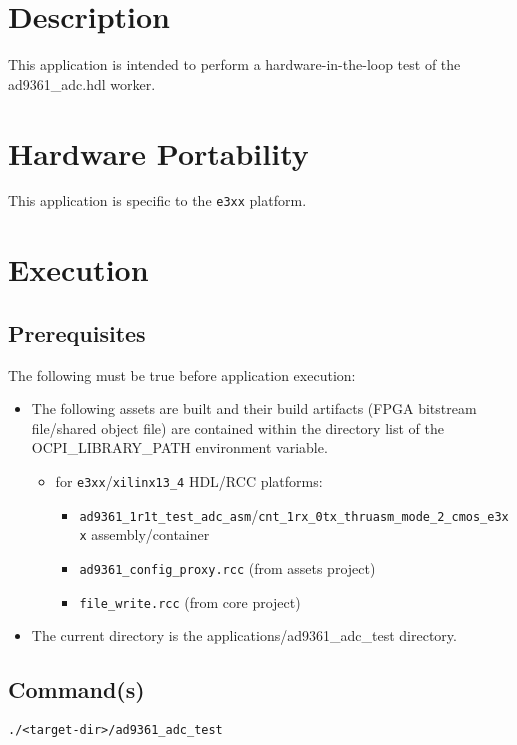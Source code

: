 \section{Description}
This application is intended to perform a hardware-in-the-loop test of the ad9361\_adc.hdl worker.

\section{Hardware Portability}
This application is specific to the \verb+e3xx+ platform.

\section{Execution}
\subsection{Prerequisites}
The following must be true before application execution:
\begin{itemize}
  \item The following assets are built and their build artifacts (FPGA bitstream file/shared object file) are contained within the directory list of the OCPI\_LIBRARY\_PATH environment variable.
  \begin{itemize}
    \item for \verb+e3xx+/\verb+xilinx13_4+ HDL/RCC platforms:
    \begin{itemize}
      \item \verb+ad9361_1r1t_test_adc_asm+/\verb+cnt_1rx_0tx_thruasm_mode_2_cmos_e3xx+ assembly/container
      \item \verb+ad9361_config_proxy.rcc+ (from assets project)
      \item \verb+file_write.rcc+ (from core project)
    \end{itemize}
  \end{itemize}
\item The current directory is the applications/ad9361\_adc\_test directory.
\end{itemize}
\subsection{Command(s)}
\begin{lstlisting}
./<target-dir>/ad9361_adc_test
\end{lstlisting}
